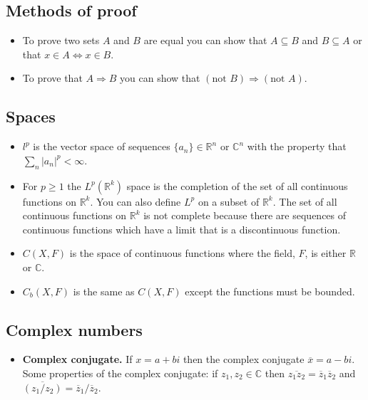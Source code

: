 \documentclass[two column]{article}
\begin{document}
\subsection{Methods of proof}

\begin{itemize}
\item To prove two sets $A$ and $B$ are equal you can show that $A \subseteq B$ and $B \subseteq A$ or that $x \in A \Leftrightarrow x \in B$. 
\item To prove that $A \Rightarrow B$ you can show that $(\text{not } B) \Rightarrow (\text{not } A)$.
\end{itemize}

\subsection{Spaces} \label{spaces}

\begin{itemize}
\item $l^{p}$ is the vector space of sequences $\{a_{n}\} \in \mathbb{R}^{n} \text{ or } \mathbb{C}^{n}$  with the property that $\sum_{n} \vert a_{n} \vert^{p} < \infty$. 
\item For $p \geq 1$ the $L^{p}(\mathbb{R}^{k})$ space is the completion of the set of all continuous functions on $\mathbb{R}^{k}$. You can also define $L^{p}$ on a subset of $\mathbb{R}^{k}$. The set of all continuous functions on $\mathbb{R}^{k}$ is not complete because there are sequences of continuous functions which have a limit that is a discontinuous function. 
\item $C(X,F)$ is the space of continuous functions where the field, $F$, is either $\mathbb{R}$ or $\mathbb{C}$.
\item $C_{b}(X,F)$ is the same as $C(X,F)$ except the functions must be bounded. 
\end{itemize}

\subsection{Complex numbers}

\begin{itemize}
\item {\bf Complex conjugate.} If $x = a + bi$ then the complex conjugate $\overline{x} = a - bi$. Some properties of the complex conjugate: if $z_{1}, z_{2} \in \mathbb{C}$ then $\overline{z_{1}z_{2}} = \overline{z}_{1} \overline{z}_{2}$ and $\overline{(z_{1}/z_{2})} = \overline{z}_{1} / \overline{z}_{2}$. 
\end{itemize}
\end{document}
